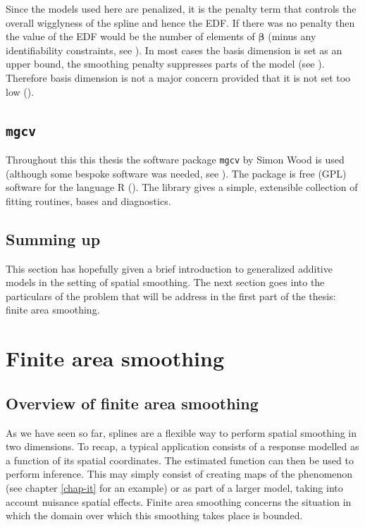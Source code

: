 Since the models used here are penalized, it is the penalty term that controls the overall wigglyness of the spline and hence the EDF. If there was no penalty then the value of the EDF would be the number of elements of $\bm{\beta}$ (minus any identifiability constraints, see ). In most cases the basis dimension is set as an upper bound, the smoothing penalty suppresses parts of the model (see ). Therefore basis dimension is not a major concern provided that it is not set too low (\cite[p. 161]{simonbook}). 


\subsection{\texttt{mgcv}}
\label{intro-mgcv}

Throughout this this thesis the software package \texttt{mgcv} by Simon Wood is used (although some bespoke software was needed, see ). The package is free (GPL) software for the language \textsf{R} (\cite{Rsoftware}). The library gives a simple, extensible collection of fitting routines, bases and diagnostics.


\subsection{Summing up}

This section has hopefully given a brief introduction to generalized additive models in the setting of spatial smoothing. The next section goes into the particulars of the problem that will be address in the first part of the thesis: finite area smoothing.


\section{Finite area smoothing}
\label{intro-FAS}

\subsection{Overview of finite area smoothing}

As we have seen so far, splines are a flexible way to perform spatial smoothing in two dimensions. To recap, a typical application consists of a response modelled as a function of its spatial coordinates. The estimated function can then be used to perform inference. This may simply consist of creating maps of the phenomenon (see chapter \ref{chap-it} for an example) or as part of a larger model, taking into account nuisance spatial effects. Finite area smoothing concerns the situation in which the domain over which this smoothing takes place is bounded.

